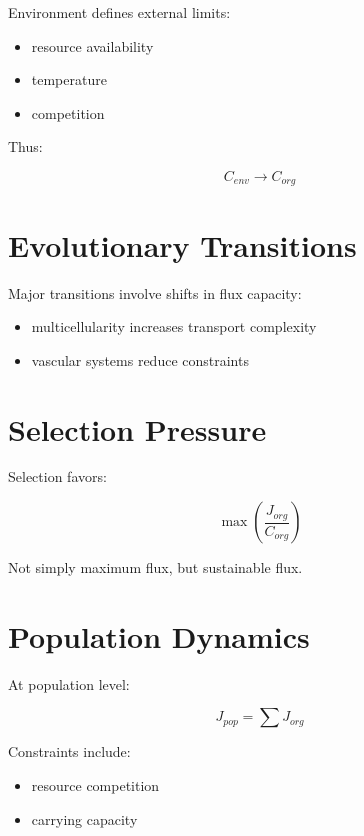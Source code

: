 \documentclass[11pt]{article}
\begin{document}
Environment defines external limits:

\begin{itemize}
    \item resource availability
    \item temperature
    \item competition
\end{itemize}

Thus:

\begin{equation}
C_{env} \rightarrow C_{org}
\end{equation}

\section{Evolutionary Transitions}

Major transitions involve shifts in flux capacity:

\begin{itemize}
    \item multicellularity increases transport complexity
    \item vascular systems reduce constraints
\end{itemize}

\section{Selection Pressure}

Selection favors:

\begin{equation}
\max \left( \frac{J_{org}}{C_{org}} \right)
\end{equation}

Not simply maximum flux, but sustainable flux.

\section{Population Dynamics}

At population level:

\begin{equation}
J_{pop} = \sum J_{org}
\end{equation}

Constraints include:

\begin{itemize}
    \item resource competition
    \item carrying capacity
\end{itemize}
\end{document}
